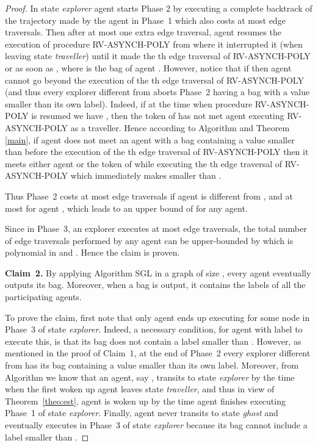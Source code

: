\documentclass [11pt] {article}
\begin{document}
\begin{proof}
{In state {\em explorer} agent  starts Phase 2 by executing a complete backtrack of the trajectory made by the agent in Phase~1 which also costs at most 
{} edge traversals. Then after at most one extra edge traversal, agent  resumes the execution of procedure RV-ASYNCH-POLY from where it interrupted it (when leaving state {\em traveller}) until it made the th edge traversal of RV-ASYNCH-POLY or as soon as , where  is the bag of agent . However, notice that if  then agent  cannot go beyond the execution of the th edge traversal of RV-ASYNCH-POLY (and thus every explorer different from  aborts Phase~2 having a bag with a value smaller than its own label). Indeed, if at the time when procedure RV-ASYNCH-POLY is resumed we  have , then the token of  has not met agent  executing RV-ASYNCH-POLY as a traveller. Hence according to Algorithm  and Theorem \ref{main}, if agent  does not meet an agent with a bag containing a value smaller than  before the execution of the th edge traversal of RV-ASYNCH-POLY then it meets either agent  or the token of  while executing the th edge traversal of 
RV-ASYNCH-POLY which immediately makes  smaller than .}

{Thus Phase~2 costs at most {} edge traversals if agent  is different from , and at most {} for agent , which leads to an upper bound of { for any agent}.}

{Since in Phase~3, an explorer executes at most  edge traversals, the total number of edge traversals performed by any agent can be upper-bounded by  {} which is polynomial in  and . Hence the claim is proven.}

\vspace*{0.3cm}

\noindent
{{\bf Claim~2.} By applying Algorithm SGL in a graph of size , every agent eventually outputs its bag. Moreover, when a bag is output, it contains the labels of all the participating agents.}

{To prove the claim, first note that only agent  ends up executing  for some node  in Phase~3 of state {\em explorer}. Indeed, a necessary condition, for agent with label  to execute this, is that its bag does not contain a label smaller than . However, as mentioned in the proof of Claim~1, at the end of Phase~2 every explorer different from  has its bag containing a value smaller than its own label. Moreover, from Algorithm  we know that an agent, say , transits to state {\em explorer} by the time when the first woken up agent leaves state {\em traveller}, and thus in view of Theorem~\ref{theo:est}, agent  is woken up by the time agent  finishes executing Phase~1 of state {\em explorer}. Finally, agent  never transits to state {\em ghost} and eventually executes  in Phase~3 of state {\em explorer} because its bag cannot include a label smaller than .}


\end{proof}
\end{document}
